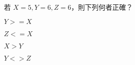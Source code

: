 \ifx\ntpcNinetyTwo\undefined[92學年基北區] \fi
若 $X=5, Y=6, Z=6$，則下列何者正確？
  \begin{optionlist}
  \item $Y >= X$\label{ntpc-92-a16}
  \item $Z <= X$
  \item $X > Y$
  \item $Y <> Z$
  \end{optionlist}